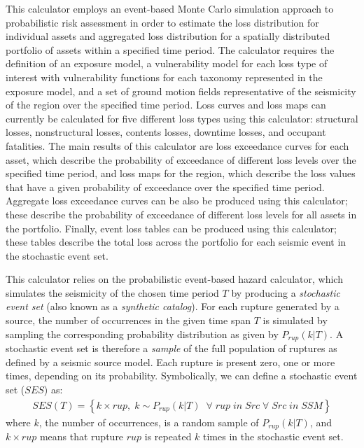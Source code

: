 This calculator employs an event-based Monte Carlo simulation approach to
probabilistic risk assessment in order to estimate the loss distribution for
individual assets and aggregated loss distribution for a spatially distributed
portfolio of assets within a specified time period. The calculator requires
the definition of an exposure model, a vulnerability model for each loss type
of interest with vulnerability functions for each taxonomy represented in the
exposure model, and a set of ground motion fields representative of the
seismicity of the region over the specified time period. Loss curves and loss
maps can currently be calculated for five different loss types using this
calculator: structural losses, nonstructural losses, contents losses, downtime
losses, and occupant fatalities. The main results of this calculator are loss
exceedance curves for each asset, which describe the probability of exceedance
of different loss levels over the specified time period, and loss maps for the
region, which describe the loss values that have a given probability of
exceedance over the specified time period. Aggregate loss exceedance curves
can be also be produced using this calculator; these describe the probability
of exceedance of different loss levels for all assets in the portfolio. Finally,
event loss tables can be produced using this calculator; these tables describe
the total loss across the portfolio for each seismic event in the stochastic
event set.

This calculator relies on the probabilistic event-based hazard calculator,
which simulates the seismicity of the chosen time period $T$ by producing a
\textit{stochastic event set} (also known as a \textit{synthetic catalog}).
For each rupture generated by a source, the number of occurrences in the given
time span $T$ is simulated by sampling the corresponding probability
distribution as given by $P_{rup}(k | T)$. A stochastic event set is therefore
a \textit{sample} of the full population of ruptures as defined by a seismic
source model. Each rupture is present zero, one or more times, depending on
its probability. Symbolically, we can define a stochastic event set ($SES$)
as:
\begin{align}
SES(T) = \left\{k \times rup,\;k\sim P_{rup}(k | T)\;\;\forall\;rup\;in\;Src\;\forall\;Src\;in\;SSM\right\}
\end{align}
where $k$, the number of occurrences, is a random sample of $P_{rup}(k | T)$,
and $k \times rup$ means that rupture $rup$ is repeated $k$ times in the
stochastic event set.

